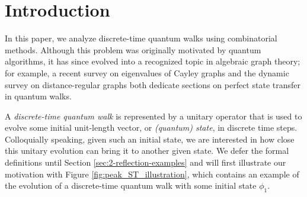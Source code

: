 \documentclass{article}
\numberwithin{equation}{section}
\begin{document}
\tableofcontents 








\section{Introduction}\label{sec:intro}

In this paper, we analyze discrete-time quantum walks using combinatorial methods. Although this problem was originally motivated by quantum algorithms, it has since evolved into a recognized topic in algebraic graph theory; for example, a recent survey on eigenvalues of Cayley graphs \cite{LiuZho2022} and the dynamic survey on distance-regular graphs \cite{vDamKooTan2016} both dedicate sections on perfect state transfer in quantum walks.

A \textsl{discrete-time quantum walk} is represented by a unitary operator that is used to evolve some initial unit-length vector, or \textsl{(quantum) state}, in discrete time steps. Colloquially speaking, given such an initial state, we are interested in how close this unitary evolution can bring it to another given state. We defer the formal definitions until Section \ref{sec:2-reflection-examples} and will first illustrate our motivation with Figure \ref{fig:peak_ST_illustration}, which contains an example of the evolution of a discrete-time quantum walk with some initial state $\phi_1$.
\end{document}
